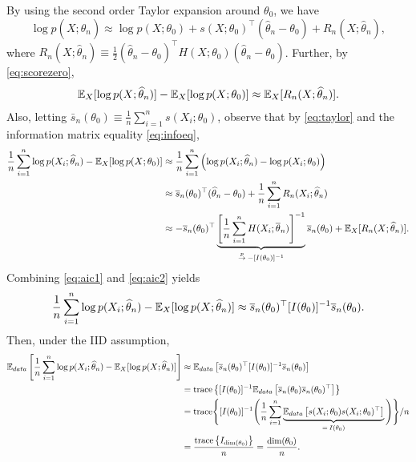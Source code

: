 \documentclass[11pt, A4paper, openany, uplatex]{book}
\begin{document}
By using the second order Taylor expansion around $\theta_0$, we have
\[
	\log p(X; \hat \theta_n) \approx \log p(X; \theta_0) + s(X; \theta_0)^\top (\hat \theta_n - \theta_0) + R_n(X; \hat \theta_n ),
\]
where $R_n(X; \hat \theta_n ) \equiv \frac{1}{2}(\hat \theta_n - \theta_0)^\top H(X; \theta_0) (\hat \theta_n - \theta_0)$.
Further, by \eqref{eq:scorezero},
\begin{align}\label{eq:aic1}
	\mathbb{E}_X[\log p(X; \widehat \theta_n)] - \mathbb{E}_X[\log p(X; \theta_0)] \approx \mathbb{E}_X[R_n(X; \widehat \theta_n )].
\end{align}
Also, letting $\bar s_n(\theta_0) \equiv \frac{1}{n}\sum_{i = 1}^n s(X_i; \theta_0)$, observe that by \eqref{eq:taylor} and the information matrix equality \eqref{eq:infoeq},
\begin{align}\label{eq:aic2}
\begin{split}
	 \frac{1}{n}\sum_{i = 1}^n \log p(X_i; \widehat \theta_n) - \mathbb{E}_X[\log p(X; \theta_0)] 
	& \approx \frac{1}{n}\sum_{i = 1}^n \left(\log p(X_i; \widehat \theta_n) - \log p(X_i; \theta_0) \right) \\
	& \approx \overline s_n(\theta_0)^\top (\widehat \theta_n - \theta_0) + \frac{1}{n}\sum_{i=1}^nR_n(X_i; \widehat \theta_n ) \\
	& \approx -\overline s_n(\theta_0)^\top \underbrace{\left[\frac{1}{n}\sum_{i=1}^n H(X_i; \overline \theta_n) \right]^{-1}}_{\overset{p}{\to}\: -[I(\theta_0)]^{-1}}\overline s_n(\theta_0) +  \mathbb{E}_X[R_n(X; \widehat \theta_n )].
\end{split}
\end{align}
Combining \eqref{eq:aic1} and \eqref{eq:aic2} yields
\[
	\frac{1}{n}\sum_{i = 1}^n \log p(X_i; \widehat \theta_n) - \mathbb{E}_X[\log p(X; \widehat \theta_n)] \approx \overline s_n(\theta_0)^\top [I(\theta_0)]^{-1}\overline s_n(\theta_0).
\]
Then, under the IID assumption,
\begin{align*}
\begin{split}
	\mathbb{E}_{data} \left[\frac{1}{n}\sum_{i = 1}^n \log p(X_i; \widehat \theta_n) - \mathbb{E}_X[\log p(X; \widehat \theta_n)]\right]
	& \approx \mathbb{E}_{data}\left[\overline s_n(\theta_0)^\top [I(\theta_0)]^{-1}\overline s_n(\theta_0)\right]\\
	& =\text{trace}\left\{ [I(\theta_0)]^{-1}\mathbb{E}_{data}\left[ \overline s_n(\theta_0)\overline s_n(\theta_0)^\top \right] \right\}\\
	& =\text{trace}\Bigg\{ [I(\theta_0)]^{-1}\Bigg(\frac{1}{n}\sum_{i = 1}^n \underbrace{\mathbb{E}_{data}\left[ s(X_i; \theta_0) s(X_i; \theta_0)^\top \right]}_{= \: I(\theta_0)} \Bigg) \Bigg\}/n\\
	& = \frac{\text{trace}\left\{I_{\text{dim}(\theta_0)}\right\}}{n} = \frac{\text{dim}(\theta_0)}{n}.
\end{split}
\end{align*}
\end{document}
